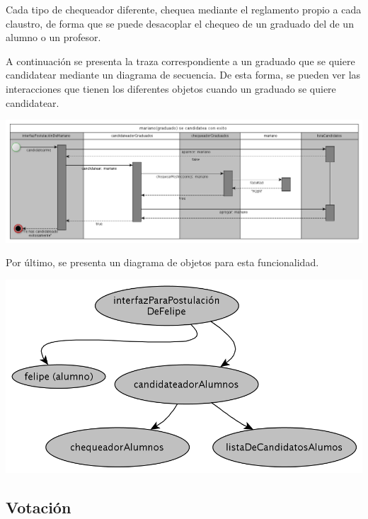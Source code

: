 Cada tipo de chequeador diferente, chequea mediante el reglamento propio a cada claustro, de forma que se puede desacoplar el chequeo de un graduado del de un alumno o un profesor.





\bigskip

A continuaci\'on se presenta la traza correspondiente a un graduado que se quiere candidatear mediante un diagrama de secuencia. De esta forma, se pueden ver las interacciones que tienen los diferentes objetos cuando un graduado se quiere candidatear.

\begin{center}
\includegraphics[scale=0.35]{diagramas/diagramaGraduadoSeCandidateaExitosamente.png}
\end{center}



\bigskip

Por \'ultimo, se presenta un diagrama de objetos para esta funcionalidad.

\begin{center}
\includegraphics[scale=0.3]{diagramas/modeloDeObjetosCandidatearse.png}
\end{center}

\subsection{Votaci\'on}

